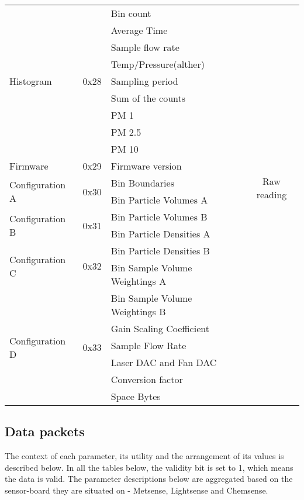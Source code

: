 \begin{center}
\begin{longtable}{|l|c|>{\centering}p{}|c|}
     \rowcolor{black!8} \multicolumn{4}{|c|}{{Alpha Sensor}} \\ \hline
        \multirow{9}{*}{Histogram} & \multirow{9}{*}{0x28} & Bin count & \multirow{20}{*}{Raw reading} \\ \cline{3-3}
        & & Average Time &\\ \cline{3-3}
        & & Sample flow rate &\\ \cline{3-3}
        & & Temp/Pressure(alther) &\\ \cline{3-3}
        & & Sampling period &\\ \cline{3-3}
        & & Sum of the counts &\\ \cline{3-3}
        & & PM 1 &\\ \cline{3-3}
        & & PM 2.5 &\\ \cline{3-3}
        & & PM 10 &\\ \cline{1-3}
        Firmware & 0x29 & Firmware version & \\ \cline{1-3}
        \multirow{2}{*}{Configuration A} & \multirow{2}{*}{0x30} & Bin Boundaries &\\ \cline{3-3}
        & & Bin Particle Volumes A &\\ \cline{1-3}
        \multirow{2}{*}{Configuration B} & \multirow{2}{*}{0x31} & Bin Particle Volumes B &\\ \cline{3-3}
        & & Bin Particle Densities A &\\ \cline{1-3}
        \multirow{2}{*}{Configuration C} & \multirow{2}{*}{0x32} & Bin Particle Densities B &\\ \cline{3-3}
        & & Bin Sample Volume Weightings A &\\ \cline{1-3}
        \multirow{6}{*}{Configuration D} & \multirow{6}{*}{0x33} & Bin Sample Volume Weightings B &\\ \cline{3-3}
        & & Gain Scaling Coefficient & \\ \cline{3-3}
        & & Sample Flow Rate & \\ \cline{3-3}
        & & Laser DAC and Fan DAC & \\ \cline{3-3}
        & & Conversion factor & \\ \cline{3-3}
        & & Space Bytes & \\ 

\end{longtable}
\end{center}


\subsection{Data packets}
The context of each parameter, its utility and the arrangement of its values is described below. In all
the tables below, the validity bit is set to 1, which means the data is valid. The parameter descriptions
below are aggregated based on the sensor-board they are situated on -
Metsense, Lightsense and Chemsense.

